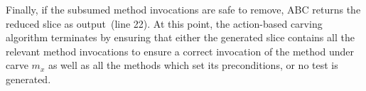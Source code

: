 \documentclass[10pt,conference]{IEEEtran}
\makeatletter
\gdef\xxx{\@ifnextchar[\xxx@lab\xxx@nolab}
\newcommand{\abc}{\textsf{ABC}\xspace}
\makeatother
\begin{document}
Finally, if the subsumed method invocations are safe to remove, \abc returns the reduced slice as output~(line 22).
At this point, the action-based carving algorithm terminates by ensuring that either the generated slice contains all the relevant
method invocations to ensure a correct invocation of the method under carve $m_x$ as well as all the methods which set
 its preconditions, or no test is generated.



\end{document}
